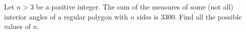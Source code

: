 Let $n>3$ be a positive integer. The sum of the measures of some (not all) interior angles of a regular polygon with $n$ sides is $3300$. Find all the possible values of $n$.
